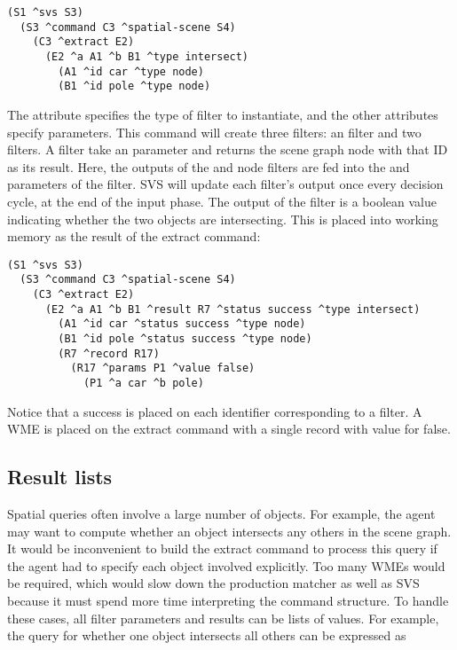 \begin{verbatim}
(S1 ^svs S3)
  (S3 ^command C3 ^spatial-scene S4)
    (C3 ^extract E2)
      (E2 ^a A1 ^b B1 ^type intersect)
        (A1 ^id car ^type node)
        (B1 ^id pole ^type node)
\end{verbatim}

The  attribute specifies the type of filter to instantiate, and the other attributes specify parameters.
This command will create three filters: an  filter and two  filters.
A  filter take an  parameter and returns the scene graph node with that ID as its result.
Here, the outputs of the  and  node filters are fed into the  and  parameters of the  filter.
SVS will update each filter's output once every decision cycle, at the end of the input phase.
The output of the  filter is a boolean value indicating whether the two objects are intersecting.
This is placed into working memory as the result of the extract command:

\begin{verbatim}
(S1 ^svs S3)
  (S3 ^command C3 ^spatial-scene S4)
    (C3 ^extract E2)
      (E2 ^a A1 ^b B1 ^result R7 ^status success ^type intersect)
        (A1 ^id car ^status success ^type node)
        (B1 ^id pole ^status success ^type node)
        (R7 ^record R17)
          (R17 ^params P1 ^value false)
            (P1 ^a car ^b pole)
\end{verbatim}

Notice that a  success is placed on each identifier corresponding to a filter.
A  WME is placed on the extract command with a single record with value  for false.

\subsection{Result lists}

Spatial queries often involve a large number of objects.
For example, the agent may want to compute whether an object intersects any others in the scene graph.
It would be inconvenient to build the extract command to process this query if the agent had to specify each object involved explicitly.
Too many WMEs would be required, which would slow down the production matcher as well as SVS because it must spend more time interpreting the command structure.
To handle these cases, all filter parameters and results can be lists of values.
For example, the query for whether one object intersects all others can be expressed as

